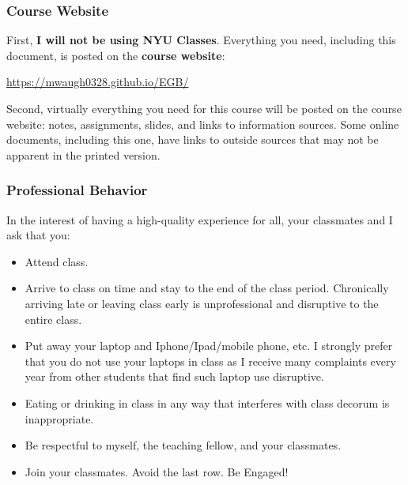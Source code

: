 \documentclass[12pt,pdftex,twoside,letterpaper]{exam}
\begin{document}
\subsubsection*{Course Website}
First, \textbf{I will not be using NYU Classes}. Everything you need, including this document, is posted on
the {\bf course website\/}:
%
\vspace{-0.15in}
\begin{center}
\url{https://mwaugh0328.github.io/EGB/}
\end{center}

Second, virtually everything you need for this course will be posted on the course website: notes, assignments, slides, and links to information sources. Some online documents, including this one, have links to outside sources that may not be apparent in the printed version.

\subsubsection*{Professional Behavior}
In the interest of having a high-quality experience for all,
your classmates and I ask that you:
\begin{itemize}
\item Attend class. 

\item Arrive to class on time and stay to the end of the class period. Chronically arriving late or leaving class early is unprofessional and disruptive to the entire class.

\item Put away your laptop and Iphone/Ipad/mobile phone, etc. I strongly prefer that you do not use your laptops in class as I receive many complaints every year from other students that find such laptop use disruptive.

\item Eating or drinking in class in any way that interferes with class decorum is inappropriate.

\item Be respectful to myself, the teaching fellow, and your classmates.

\item Join your classmates. Avoid the last row. Be Engaged!
\end{itemize}
\end{document}
